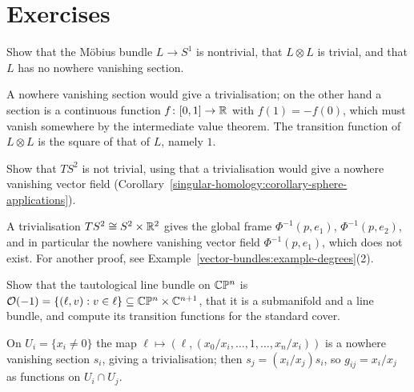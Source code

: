 \section{Exercises}\label{vector-bundles:section-exercises}

\begin{exercise}\label{vector-bundles:exercise-mobius}
Show that the M\"obius bundle $L \to S^1$ is nontrivial, that $L \otimes L$ is trivial, and that $L$ has no nowhere vanishing section.
\end{exercise}

\begin{solution}
A nowhere vanishing section would give a trivialisation; on the other hand a section is a continuous function $f \colon [0, 1] \to \mathbb{R}$ with $f(1) = -f(0)$, which must vanish somewhere by the intermediate
value theorem. The transition function of $L \otimes L$ is the square of that of $L$, namely $1$.
\end{solution}

\begin{exercise}\label{vector-bundles:exercise-tangent-sphere-nontrivial}
Show that $TS^2$ is not trivial, using that a trivialisation would give a nowhere vanishing vector field (Corollary~\ref{singular-homology:corollary-sphere-applications}).
\end{exercise}

\begin{solution}
A trivialisation $TS^2 \cong S^2 \times \mathbb{R}^2$ gives the global frame $\Phi^{-1}(p, e_1)$, $\Phi^{-1}(p, e_2)$, and in particular the nowhere vanishing vector field $\Phi^{-1}(p, e_1)$,
which does not exist. For another proof, see Example~\ref{vector-bundles:example-degrees}(2).
\end{solution}

\begin{exercise}\label{vector-bundles:exercise-tautological}
Show that the tautological line bundle on $\mathbb{C}\mathbb{P}^n$ is $\mathcal{O}(-1) = \{(\ell, v) : v \in \ell\} \subseteq \mathbb{C}\mathbb{P}^n \times \mathbb{C}^{n+1}$, that it is a submanifold and a line bundle, and compute its transition
functions for the standard cover.
\end{exercise}

\begin{solution}
On $U_i = \{x_i \neq 0\}$ the map $\ell \mapsto (\ell, (x_0/x_i, \ldots, 1, \ldots, x_n/x_i))$ is a nowhere vanishing section $s_i$, giving a trivialisation; then $s_j = (x_i/x_j)s_i$, so
$g_{ij} = x_i/x_j$ as functions on $U_i \cap U_j$.
\end{solution}

